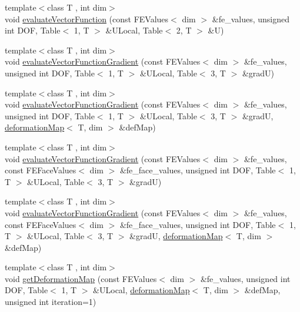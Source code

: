 \begin{DoxyCompactItemize}
\item 
{\footnotesize template$<$class T , int dim$>$ }\\void \hyperlink{group___evaluation_functions_gab9e164be1be244df81c932426a4bd513}{evaluate\-Vector\-Function} (const F\-E\-Values$<$ dim $>$ \&fe\-\_\-values, unsigned int D\-O\-F, Table$<$ 1, T $>$ \&U\-Local, Table$<$ 2, T $>$ \&U)
\item 
{\footnotesize template$<$class T , int dim$>$ }\\void \hyperlink{group___evaluation_functions_ga84eb2ee714466f113c96fcf6a9fd23e8}{evaluate\-Vector\-Function\-Gradient} (const F\-E\-Values$<$ dim $>$ \&fe\-\_\-values, unsigned int D\-O\-F, Table$<$ 1, T $>$ \&U\-Local, Table$<$ 3, T $>$ \&grad\-U)
\item 
{\footnotesize template$<$class T , int dim$>$ }\\void \hyperlink{group___evaluation_functions_ga5adf8aa2d91dbdf393aa91dcc65e42e8}{evaluate\-Vector\-Function\-Gradient} (const F\-E\-Values$<$ dim $>$ \&fe\-\_\-values, unsigned int D\-O\-F, Table$<$ 1, T $>$ \&U\-Local, Table$<$ 3, T $>$ \&grad\-U, \hyperlink{structdeformation_map}{deformation\-Map}$<$ T, dim $>$ \&def\-Map)
\item 
{\footnotesize template$<$class T , int dim$>$ }\\void \hyperlink{group___evaluation_functions_gab2771d18ff704decbbc12ca2b848bbfe}{evaluate\-Vector\-Function\-Gradient} (const F\-E\-Values$<$ dim $>$ \&fe\-\_\-values, const F\-E\-Face\-Values$<$ dim $>$ \&fe\-\_\-face\-\_\-values, unsigned int D\-O\-F, Table$<$ 1, T $>$ \&U\-Local, Table$<$ 3, T $>$ \&grad\-U)
\item 
{\footnotesize template$<$class T , int dim$>$ }\\void \hyperlink{group___evaluation_functions_ga9608539d601a91aff1ba01ccc720fbe0}{evaluate\-Vector\-Function\-Gradient} (const F\-E\-Values$<$ dim $>$ \&fe\-\_\-values, const F\-E\-Face\-Values$<$ dim $>$ \&fe\-\_\-face\-\_\-values, unsigned int D\-O\-F, Table$<$ 1, T $>$ \&U\-Local, Table$<$ 3, T $>$ \&grad\-U, \hyperlink{structdeformation_map}{deformation\-Map}$<$ T, dim $>$ \&def\-Map)
\item 
{\footnotesize template$<$class T , int dim$>$ }\\void \hyperlink{group___evaluation_functions_ga62b026b5bcee0bda21159ff6782b4b59}{get\-Deformation\-Map} (const F\-E\-Values$<$ dim $>$ \&fe\-\_\-values, unsigned int D\-O\-F, Table$<$ 1, T $>$ \&U\-Local, \hyperlink{structdeformation_map}{deformation\-Map}$<$ T, dim $>$ \&def\-Map, unsigned int iteration=1)

\end{DoxyCompactItemize}
